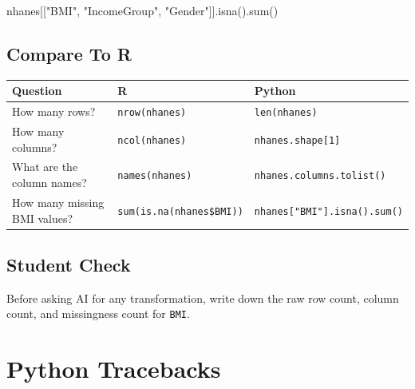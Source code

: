 \documentclass[
  letterpaper,
  DIV=11,
  numbers=noendperiod,
  oneside]{scrreprt}
\newenvironment{Shaded}{\begin{snugshade}}{\end{snugshade}}
\newcommand{\BuiltInTok}[1]{\textcolor[rgb]{0.00,0.23,0.31}{#1}}
\newcommand{\NormalTok}[1]{\textcolor[rgb]{0.00,0.23,0.31}{#1}}
\newcommand{\StringTok}[1]{\textcolor[rgb]{0.13,0.47,0.30}{#1}}
\begin{document}
\begin{Shaded}
\begin{Highlighting}[numbers=left,,]
\NormalTok{nhanes[[}\StringTok{"BMI"}\NormalTok{, }\StringTok{"IncomeGroup"}\NormalTok{, }\StringTok{"Gender"}\NormalTok{]].isna().}\BuiltInTok{sum}\NormalTok{()}
\end{Highlighting}
\end{Shaded}

\section{Compare To R}\label{compare-to-r}

\begin{longtable}[]{@{}
  >{\raggedright\arraybackslash}p{}
  >{\raggedright\arraybackslash}p{}
  >{\raggedright\arraybackslash}p{}@{}}
\toprule\noalign{}
\begin{minipage}[b]{\linewidth}\raggedright
Question
\end{minipage} & \begin{minipage}[b]{\linewidth}\raggedright
R
\end{minipage} & \begin{minipage}[b]{\linewidth}\raggedright
Python
\end{minipage} \\
\midrule\noalign{}
\endhead
\bottomrule\noalign{}
\endlastfoot
How many rows? & \texttt{nrow(nhanes)} & \texttt{len(nhanes)} \\
How many columns? & \texttt{ncol(nhanes)} &
\texttt{nhanes.shape{[}1{]}} \\
What are the column names? & \texttt{names(nhanes)} &
\texttt{nhanes.columns.tolist()} \\
How many missing BMI values? & \texttt{sum(is.na(nhanes\$BMI))} &
\texttt{nhanes{[}"BMI"{]}.isna().sum()} \\
\end{longtable}

\section{Student Check}\label{student-check}

Before asking AI for any transformation, write down the raw row count,
column count, and missingness count for \texttt{BMI}.

\chapter{Python Tracebacks}\label{python-tracebacks}
\end{document}
